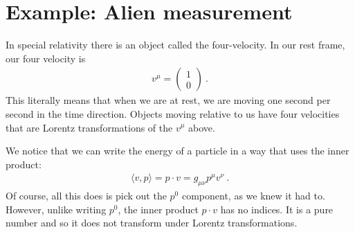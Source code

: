 

\section{Example: Alien measurement}
\label{sec:relativity:alien}


In special relativity there is an object called the four-velocity. In our rest frame, our four velocity is
\begin{align}
    v^\mu = \begin{pmatrix}
        1\\ 0
    \end{pmatrix} \ .
    \label{eq:4:velocity:in:rest:Frame}
\end{align}
This literally means that when we are at rest, we are moving one second per second in the time direction. Objects moving relative to us have four velocities that are Lorentz transformations of the $v^\mu$ above. 

We notice that we can write the energy of a particle in a way that uses the inner product:
\begin{align}
    \langle v, p\rangle = p\cdot v = g_{\mu\nu} p^\mu v^\nu \ .
\end{align}
Of course, all this does is pick out the $p^0$ component, as we knew it had to. However, unlike writing $p^0$, the inner product $p\cdot v$ has no indices. It is a pure number and so it does not transform under Lorentz transformations. 

